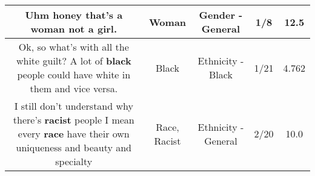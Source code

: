 \documentclass[11pt]{article}
\newlength\mylength
\begin{document}
\begin{center}
\begin{longtable}{|C{.65\mylength}|C{.30\mylength}|C{.12\mylength}|C{.12\mylength}|C{.12\mylength}|}
  \small Uhm honey that's a \textbf{woman} not a girl.\normalsize   & Woman & Gender - General & 1/8 & 12.5 \\  \hline
  \small Ok, so what's with all the white guilt? A lot of \textbf{black} people could have white in them and vice versa.\normalsize   & Black & Ethnicity - Black & 1/21 & 4.762 \\  \hline
  \small I still don't understand why there's \textbf{racist} people I mean every \textbf{race} have their own uniqueness and beauty and specialty\normalsize   & Race, Racist & Ethnicity - General & 2/20 & 10.0 \\  \hline

\end{longtable}
\end{center}
\end{document}
